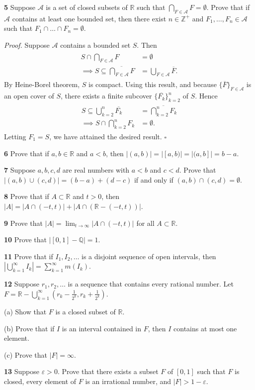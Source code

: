 \documentclass[a4paper]{article}
\newcommand{\R}{\mathbb{R}}
\newcommand{\Q}{\mathbb{Q}}
\newcommand{\Z}{\mathbb{Z}}
\begin{document}
\textbf{5} Suppose $\mathcal{A}$ is a set of closed subsets of $\R$ such that $\bigcap_{F \in \mathcal{A}} F = \emptyset$. Prove that if $\mathcal{A}$ contains at least one bounded set, then there exist $n \in \Z^+$ and $F_1, \ldots, F_n \in \mathcal{A}$ such that $F_1 \cap \ldots \cap F_n = \emptyset$.

\emph{Proof.} Suppose $\mathcal{A}$ contains a bounded set $S$. Then
\begin{align}
\begin{split}
    S \cap \bigcap_{F \in \mathcal{A}} F &= \emptyset \\
    \implies S \subseteq \overline{\bigcap_{F \in \mathcal{A}} F} &= \bigcup_{F \in \mathcal{A}} \overline{F}.
\end{split}
\end{align}
By Heine-Borel theorem, $S$ is compact. Using this result, and because $\{\overline{F}\}_{F \in \mathcal{A}}$ is an open cover of $S$, there exists a finite subcover $\{\overline{F_k}\}_{k=2}^n$ of $S$. Hence
\begin{align}
\begin{split}
    S \subseteq \bigcup_{k=2}^n \overline{F_k} &= \overline{\bigcap_{k=2}^n F_k} \\
    \implies S \cap \bigcap_{k=2}^n F_k &= \emptyset.
\end{split}
\end{align}
Letting $F_1 = S$, we have attained the desired result. $\square$

\textbf{6} Prove that if $a, b \in \R$ and $a < b$, then $|(a, b)| = |[a, b)| = |(a, b]| = b - a$.

\textbf{7} Suppose $a, b, c, d$ are real numbers with $a < b$ and $c < d$. Prove that $|(a, b) \cup (c, d)| = (b - a) + (d - c)$ if and only if $(a, b) \cap (c, d) = \emptyset$.

\textbf{8} Prove that if $A \subset \R$ and $t > 0$, then $|A| = |A \cap (-t, t)| + |A \cap (\R - (-t, t))|$.

\textbf{9} Prove that $|A| = \lim_{t \to \infty} |A \cap (-t, t)|$ for all $A \subset \R$.

\textbf{10} Prove that $|[0, 1] - \Q| = 1$.

\textbf{11} Prove that if $I_1, I_2, \ldots$ is a disjoint sequence of open intervals, then $\left|\bigcup_{k=1}^\infty I_k\right| = \sum_{k=1}^\infty m(I_k)$.

\textbf{12} Suppose $r_1, r_2, \ldots$ is a sequence that contains every rational number. Let $F = \R - \bigcup_{k=1}^\infty \left(r_k - \frac{1}{2^k}, r_k + \frac{1}{2^k}\right)$.

(a) Show that $F$ is a closed subset of $\R$.

(b) Prove that if $I$ is an interval contained in $F$, then $I$ contains at most one element.

(c) Prove that $|F| = \infty$.

\textbf{13} Suppose $\varepsilon > 0$. Prove that there exists a subset $F$ of $[0, 1]$ such that $F$ is closed, every element of $F$ is an irrational number, and $|F| > 1 - \varepsilon$.
\end{document}
